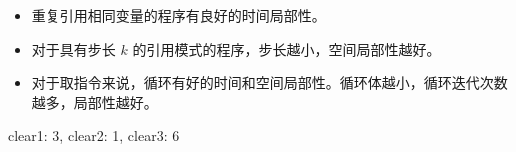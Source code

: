 {{        \begin{itemize}
            \item 重复引用相同变量的程序有良好的时间局部性。
            \item 对于具有步长 $k$ 的引用模式的程序，步长越小，空间局部性越好。
            \item 对于取指令来说，循环有好的时间和空间局部性。循环体越小，循环迭代次数越多，局部性越好。
        \end{itemize}

        \begin{practicec}

        \end{practicec}

        \begin{practicec}
            clear1: 3, clear2: 1, clear3: 6
        \end{practicec}
    }
}
